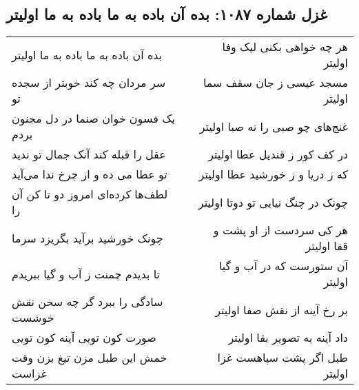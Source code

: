 \begin{center}
\section*{غزل شماره ۱۰۸۷: بده آن باده به ما باده به ما اولیتر}
\label{sec:1087}
\begin{longtable}{l p{0.5cm} r}
بده آن باده به ما باده به ما اولیتر
&&
هر چه خواهی بکنی لیک وفا اولیتر
\\
سر مردان چه کند خوبتر از سجده تو
&&
مسجد عیسی ز جان سقف سما اولیتر
\\
یک فسون خوان صنما در دل مجنون بردم
&&
غنج‌های چو صبی را نه صبا اولیتر
\\
عقل را قبله کند آنک جمال تو ندید
&&
در کف کور ز قندیل عطا اولیتر
\\
تو عطا می ده و از چرخ ندا می‌آید
&&
که ز دریا و ز خورشید عطا اولیتر
\\
لطف‌ها کرده‌ای امروز دو تا کن آن را
&&
چونک در چنگ نیایی تو دوتا اولیتر
\\
چونک خورشید برآید بگریزد سرما
&&
هر کی سردست از او پشت و قفا اولیتر
\\
تا بدیدم چمنت ز آب و گیا ببریدم
&&
آن ستورست که در آب و گیا اولیتر
\\
سادگی را ببرد گر چه سخن نقش خوشست
&&
بر رخ آینه از نقش صفا اولیتر
\\
صورت کون تویی آینه کون تویی
&&
داد آینه به تصویر بقا اولیتر
\\
خمش این طبل مزن تیغ بزن وقت غزاست
&&
طبل اگر پشت سپاهست غزا اولیتر
\\
\end{longtable}
\end{center}
